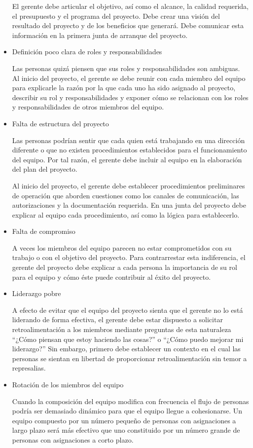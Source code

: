 \begin{itemize}
El gerente debe articular el objetivo, así como el alcance, la calidad requerida, el presupuesto y el programa del proyecto. Debe crear una visión del resultado del proyecto y de los beneficios que generará. Debe comunicar esta información en la primera junta de arranque del proyecto.

\item Definición poco clara de roles y responsabilidades 

Las personas quizá piensen que sus roles y responsabilidades son ambiguas. Al inicio del proyecto, el gerente se debe reunir con cada miembro del equipo para explicarle la razón por la que cada uno ha sido asignado al proyecto, describir su rol y responsabilidades y exponer cómo se relacionan con los roles y responsabilidades de otros miembros del equipo.

\item Falta de estructura del proyecto 

Las personas podrían sentir que cada quien está trabajando en una dirección diferente o que no existen procedimientos establecidos para el funcionamiento del equipo. Por tal razón, el gerente debe incluir al equipo en la elaboración del plan del proyecto. 

 Al inicio del proyecto, el gerente debe establecer procedimientos preliminares de operación que aborden cuestiones como los canales de comunicación, las autorizaciones y la documentación requerida. En una junta del proyecto debe explicar al equipo cada procedimiento, así como la lógica para establecerlo.

\item Falta de compromiso 

A veces los miembros del equipo parecen no estar comprometidos con su trabajo o con el objetivo del proyecto. Para contrarrestar esta indiferencia, el gerente del proyecto debe explicar a cada persona la importancia de su rol para el equipo y cómo éste puede contribuir al éxito del proyecto.
\item Liderazgo pobre 

A efecto de evitar que el equipo del proyecto sienta que el gerente no lo está liderando de forma efectiva, el gerente debe estar dispuesto a solicitar retroalimentación a los miembros mediante preguntas de esta naturaleza “¿Cómo piensan que estoy haciendo las cosas?” o “¿Cómo puedo mejorar mi liderazgo?” Sin embargo, primero debe establecer un contexto en el cual las personas se sientan en libertad de proporcionar retroalimentación sin temor a represalias.
\item Rotación de los miembros del equipo 

Cuando la composición del equipo modifica con frecuencia el flujo de personas podría ser demasiado dinámico para que el equipo llegue a cohesionarse. Un equipo compuesto por un número pequeño de personas con asignaciones a largo plazo será más efectivo que uno constituido por un número grande de personas con asignaciones a corto plazo.\cite{J. Gido P.}
\end{itemize}


